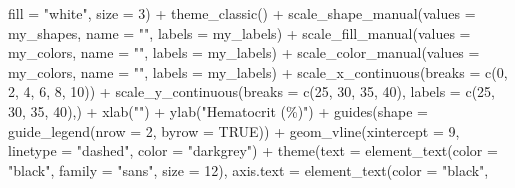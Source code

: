 \documentclass[
]{article}
\newenvironment{Shaded}{\begin{snugshade}}{\end{snugshade}}
\newcommand{\AttributeTok}[1]{\textcolor[rgb]{0.77,0.63,0.00}{#1}}
\newcommand{\ConstantTok}[1]{\textcolor[rgb]{0.00,0.00,0.00}{#1}}
\newcommand{\DecValTok}[1]{\textcolor[rgb]{0.00,0.00,0.81}{#1}}
\newcommand{\FunctionTok}[1]{\textcolor[rgb]{0.00,0.00,0.00}{#1}}
\newcommand{\NormalTok}[1]{#1}
\newcommand{\SpecialCharTok}[1]{\textcolor[rgb]{0.00,0.00,0.00}{#1}}
\newcommand{\StringTok}[1]{\textcolor[rgb]{0.31,0.60,0.02}{#1}}
\begin{document}
\begin{Shaded}
\begin{Highlighting}[]
            \AttributeTok{fill =} \StringTok{"white"}\NormalTok{,}
            \AttributeTok{size =} \DecValTok{3}\NormalTok{) }\SpecialCharTok{+}
  \FunctionTok{theme\_classic}\NormalTok{() }\SpecialCharTok{+} 
  \FunctionTok{scale\_shape\_manual}\NormalTok{(}\AttributeTok{values =}\NormalTok{ my\_shapes, }\AttributeTok{name =} \StringTok{""}\NormalTok{,}
                     \AttributeTok{labels =}\NormalTok{ my\_labels) }\SpecialCharTok{+}
  \FunctionTok{scale\_fill\_manual}\NormalTok{(}\AttributeTok{values =}\NormalTok{ my\_colors, }\AttributeTok{name =} \StringTok{""}\NormalTok{,}
                     \AttributeTok{labels =}\NormalTok{ my\_labels) }\SpecialCharTok{+}
  \FunctionTok{scale\_color\_manual}\NormalTok{(}\AttributeTok{values =}\NormalTok{ my\_colors, }\AttributeTok{name =} \StringTok{""}\NormalTok{,}
                     \AttributeTok{labels =}\NormalTok{ my\_labels) }\SpecialCharTok{+}
  \FunctionTok{scale\_x\_continuous}\NormalTok{(}\AttributeTok{breaks =} \FunctionTok{c}\NormalTok{(}\DecValTok{0}\NormalTok{, }\DecValTok{2}\NormalTok{, }\DecValTok{4}\NormalTok{, }\DecValTok{6}\NormalTok{, }\DecValTok{8}\NormalTok{, }\DecValTok{10}\NormalTok{)) }\SpecialCharTok{+}
  \FunctionTok{scale\_y\_continuous}\NormalTok{(}\AttributeTok{breaks =} \FunctionTok{c}\NormalTok{(}\DecValTok{25}\NormalTok{, }\DecValTok{30}\NormalTok{, }\DecValTok{35}\NormalTok{, }\DecValTok{40}\NormalTok{),}
                     \AttributeTok{labels =} \FunctionTok{c}\NormalTok{(}\DecValTok{25}\NormalTok{, }\DecValTok{30}\NormalTok{, }\DecValTok{35}\NormalTok{, }\DecValTok{40}\NormalTok{),) }\SpecialCharTok{+}
  \FunctionTok{xlab}\NormalTok{(}\StringTok{""}\NormalTok{) }\SpecialCharTok{+} 
  \FunctionTok{ylab}\NormalTok{(}\StringTok{"Hematocrit (\%)"}\NormalTok{) }\SpecialCharTok{+} 
  \FunctionTok{guides}\NormalTok{(}\AttributeTok{shape =} \FunctionTok{guide\_legend}\NormalTok{(}\AttributeTok{nrow =} \DecValTok{2}\NormalTok{, }\AttributeTok{byrow =} \ConstantTok{TRUE}\NormalTok{)) }\SpecialCharTok{+}
  \FunctionTok{geom\_vline}\NormalTok{(}\AttributeTok{xintercept =} \DecValTok{9}\NormalTok{,}
             \AttributeTok{linetype =} \StringTok{"dashed"}\NormalTok{,}
             \AttributeTok{color =} \StringTok{"darkgrey"}\NormalTok{) }\SpecialCharTok{+}
  \FunctionTok{theme}\NormalTok{(}\AttributeTok{text =} \FunctionTok{element\_text}\NormalTok{(}\AttributeTok{color =} \StringTok{"black"}\NormalTok{, }
                            \AttributeTok{family =} \StringTok{"sans"}\NormalTok{, }
                            \AttributeTok{size =} \DecValTok{12}\NormalTok{),}
        \AttributeTok{axis.text =} \FunctionTok{element\_text}\NormalTok{(}\AttributeTok{color =} \StringTok{"black"}\NormalTok{, }

\end{Highlighting}
\end{Shaded}
\end{document}
